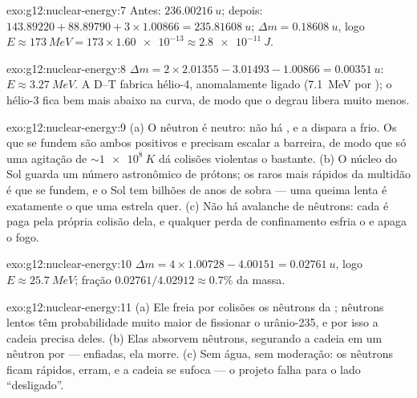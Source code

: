 \begin{solution}{exo:g12:nuclear-energy:7}
Antes: $\qty{236.00216}{u}$; depois:
$143.89220 + 88.89790 + 3 \times 1.00866 = \qty{235.81608}{u}$;
$\Delta m = \qty{0.18608}{u}$, logo
$E \approx \qty{173}{MeV} = 173 \times \num{1.60e-13} \approx
\qty{2.8e-11}{J}$.
\end{solution}

\begin{solution}{exo:g12:nuclear-energy:8}
$\Delta m = 2 \times 2.01355 - 3.01493 - 1.00866 = \qty{0.00351}{u}$:
$E \approx \qty{3.27}{MeV}$. A D--T fabrica hélio-4, anomalamente ligado
(\qty{7.1}{MeV} por ); o hélio-3 fica bem mais abaixo na curva, de
modo que o degrau libera muito menos.
\end{solution}

\begin{solution}{exo:g12:nuclear-energy:9}
(a) O nêutron é neutro: não há , e a  dispara a
frio. Os  que se fundem são ambos positivos e precisam escalar a
barreira, de modo que só uma agitação de $\sim \qty{1e8}{K}$ dá colisões
violentas o bastante. (b) O núcleo do Sol guarda um número astronômico de
prótons; os raros mais rápidos da multidão é que se fundem, e o Sol tem
bilhões de anos de sobra --- uma queima lenta é exatamente o que uma
estrela quer. (c) Não há avalanche de nêutrons: cada  é paga pela
própria colisão dela, e qualquer perda de confinamento esfria o  e
apaga o fogo.
\end{solution}

\begin{solution}{exo:g12:nuclear-energy:10}
$\Delta m = 4 \times 1.00728 - 4.00151 = \qty{0.02761}{u}$, logo
$E \approx \qty{25.7}{MeV}$; fração $0.02761/4.02912 \approx 0.7\%$ da
massa.
\end{solution}

\begin{solution}{exo:g12:nuclear-energy:11}
(a) Ele freia por colisões os nêutrons da ; nêutrons lentos têm
probabilidade muito maior de fissionar o urânio-235, e por isso a cadeia
precisa deles. (b) Elas absorvem nêutrons, segurando a cadeia em um
nêutron por  --- enfiadas, ela morre. (c) Sem água, sem moderação:
os nêutrons ficam rápidos, erram, e a cadeia se sufoca --- o projeto
falha para o lado ``desligado''.
\end{solution}

